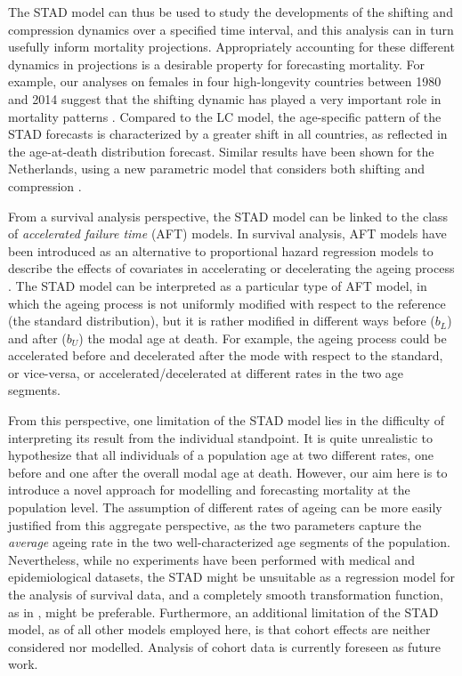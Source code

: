 \documentclass[Thesis]{subfiles}
\begin{document}
The STAD model can thus be used to study the developments of the shifting and compression dynamics over a specified time interval, and this analysis can in turn usefully inform mortality projections. Appropriately accounting for these different dynamics in projections is a desirable property for forecasting mortality. For example, our analyses on females in four high-longevity countries between 1980 and 2014 suggest that the shifting dynamic has played a very important role in mortality patterns \citep[as it has been observed elsewhere, for example][]{canudas2008modal,bergeron2015decomposing,de2016new}. Compared to the LC model, the age-specific pattern of the STAD forecasts is characterized by a greater shift in all countries, as reflected in the age-at-death distribution forecast. Similar results have been shown for the Netherlands, using a new parametric model that considers both shifting and compression \citep{janssen2016projecting}.


From a survival analysis perspective, the STAD model can be linked to
the class of \emph{accelerated failure time} (AFT) models. In survival
analysis, AFT models have been introduced as an alternative to
proportional hazard regression models to describe the effects of
covariates in accelerating or decelerating the ageing process
\citep{wei1992accelerated,kalbfleisch2002statistical}. The STAD model
can be interpreted as a particular type of AFT model, in which the
ageing process is not uniformly modified with respect to the reference
(the standard distribution), but it is rather modified in different
ways before ($b_L$) and after ($b_U$) the modal age at death. For
example, the ageing process could be accelerated before and
decelerated after the mode with respect to the standard, or
vice-versa, or accelerated/decelerated at different rates in the two
age segments. 

From this perspective, one limitation of the STAD model lies in the difficulty of interpreting its result from the individual standpoint. It is quite unrealistic to hypothesize that all individuals of a population age at two different rates, one before and one after the overall modal age at death. However, our aim here is to introduce a novel approach for modelling and forecasting mortality at the population level. The assumption of different rates of ageing can
be more easily justified from this aggregate perspective, as the two parameters capture the \emph{average} ageing rate in the two well-characterized age segments of the population. Nevertheless, while no experiments have been performed with medical and epidemiological datasets, the STAD might be unsuitable as a regression model for the analysis of
survival data, and a completely smooth transformation function, as in \cite{camarda2008warped}, might be preferable. Furthermore, an additional limitation of the STAD model, as of all other models employed here, is that cohort effects are neither considered nor modelled. Analysis of cohort data is currently foreseen as future work.
\end{document}
